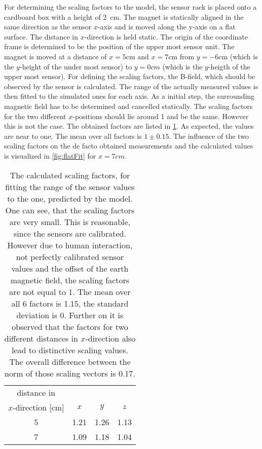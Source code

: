 For determining the scaling factors to the model, the sensor rack is placed onto a cardboard box with a height of \SI{2}{\cm}. The magnet is statically aligned in the same direction as the sensor $ x $-axis and is moved along the y-axis on a flat surface. The distance in $ x $-direction is held static. The origin of the coordinate frame is determined to be the position of the upper most sensor unit. The magnet is moved at a distance of $ x=5\si{\cm} $ and $ x=7\si{\cm} $ from $ y=-6\si{\cm} $ (which is the $ y $-height of the under most sensor) to $ y=0\si{cm} $ (which is the $ y $-heigth of the upper most sensor). For defining the scaling factors, the B-field, which should be observed by the sensor is calculated. The range of the actually measured values is then fitted to the simulated ones for each axis. As a initial step, the surrounding magnetic field has to be determined and cancelled statically. The scaling factors for the two different $ x $-positions should lie around 1 and be the same. However this is not the case. The obtained factors are listed in \ref{tab:scaleValues}. As expected, the values are near to one. The mean over all factors is $ 1 \pm 0.15 $. The influence of the two scaling factors on the de facto obtained measurements and the calculated values is visualized in \ref{fig:flatFit} for $ x=7\si{cm} $.
\begin{table}[h]
\centering
\begin{tabular}{c c c c}
\toprule
distance in &  &  &  \\ 
$ x $-direction [cm] & $ x $ & $ y $ &  $ z $ \\ \midrule
5 & 1.21 & 1.26 & 1.13 \\
7 & 1.09 & 1.18 & 1.04 \\ \bottomrule
\end{tabular}
\caption{The calculated scaling factors, for fitting the range of the sensor values to the one, predicted by the model. One can see, that the scaling factors are very small. This is reasonable, since the sensors are calibrated. However due to human interaction, not perfectly calibrated sensor values and the offset of the earth magnetic field, the scaling factors are not equal to 1. The mean over all 6 factors is 1.15, the standard deviation is 0. Further on it is observed that the factors for two different distances in $ x $-direction also lead to distinctive scaling values. The overall difference between the norm of those scaling vectors is 0.17.}
\label{tab:scaleValues}
\end{table}
